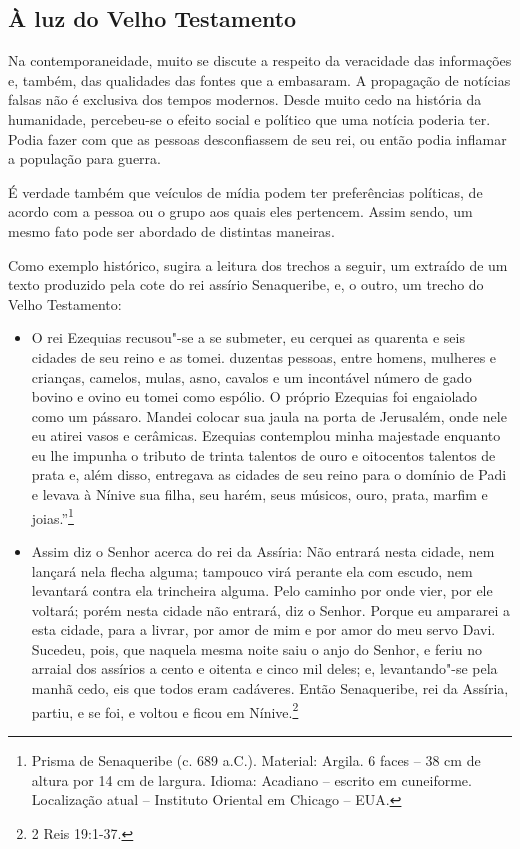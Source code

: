 \documentclass[12pt]{extarticle}
\begin{document}
\subsection{À luz do Velho Testamento}


Na contemporaneidade, muito se discute a respeito da veracidade das
informações e, também, das qualidades das fontes que a embasaram. A
propagação de notícias falsas não é exclusiva dos tempos modernos.
Desde muito cedo na história da humanidade, percebeu-se o efeito
social e político que uma notícia poderia ter. Podia fazer com que as
pessoas desconfiassem de seu rei, ou então podia inflamar a população
para guerra.

É verdade também que veículos de mídia podem ter preferências políticas,
de acordo com a pessoa ou o grupo aos quais eles pertencem. Assim sendo,
um mesmo fato pode ser abordado de distintas maneiras.

Como exemplo histórico, sugira a leitura dos trechos a seguir, um
extraído de um texto produzido pela cote do rei assírio Senaqueribe, e,
o outro, um trecho do Velho Testamento:

\begin{itemize}
\item
O rei Ezequias recusou"-se a se submeter, eu cerquei as quarenta e seis
cidades de seu reino e as tomei. duzentas pessoas, entre homens,
mulheres e crianças, camelos, mulas, asno, cavalos e um incontável
número de gado bovino e ovino eu tomei como espólio. O próprio
Ezequias foi engaiolado como um pássaro. Mandei colocar sua jaula na
porta de Jerusalém, onde nele eu atirei vasos e cerâmicas. Ezequias
contemplou minha majestade enquanto eu lhe impunha o tributo de trinta
talentos de ouro e oitocentos talentos de prata e, além disso,
entregava as cidades de seu reino para o domínio de Padi e levava à
Nínive sua filha, seu harém, seus músicos, ouro, prata, marfim e
joias.''\footnote{Prisma de Senaqueribe (c. 689 a.C.). Material: Argila. 6 faces -- 38 cm de altura por 14 cm de largura. Idioma: Acadiano -- escrito em
cuneiforme. Localização atual -- Instituto Oriental em Chicago --
EUA.}

\item
  Assim diz o Senhor acerca do rei da Assíria: Não entrará nesta cidade,
  nem lançará nela flecha alguma; tampouco virá perante ela com escudo,
  nem levantará contra ela trincheira alguma. Pelo caminho por onde
  vier, por ele voltará; porém nesta cidade não entrará, diz o Senhor.
  Porque eu ampararei a esta cidade, para a livrar, por amor de mim e
  por amor do meu servo Davi. Sucedeu, pois, que naquela mesma noite
  saiu o anjo do Senhor, e feriu no arraial dos assírios a cento e
  oitenta e cinco mil deles; e, levantando"-se pela manhã cedo, eis que
  todos eram cadáveres. Então Senaqueribe, rei da Assíria, partiu, e se
  foi, e voltou e ficou em Nínive.\footnote{2 Reis 19:1-37.}
\end{itemize}
\end{document}
